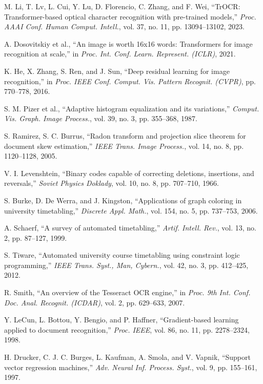 \documentclass[12pt,letterpaper]{report}
\begin{document}
\begin{enumerate}[label={[\arabic*]}, leftmargin=2.5em]
    \item M. Li, T. Lv, L. Cui, Y. Lu, D. Florencio, C. Zhang, and F. Wei, ``TrOCR: Transformer-based optical character recognition with pre-trained models,'' \textit{Proc. AAAI Conf. Human Comput. Intell.}, vol. 37, no. 11, pp. 13094--13102, 2023.
    \item A. Dosovitskiy et al., ``An image is worth 16x16 words: Transformers for image recognition at scale,'' in \textit{Proc. Int. Conf. Learn. Represent. (ICLR)}, 2021.
    \item K. He, X. Zhang, S. Ren, and J. Sun, ``Deep residual learning for image recognition,'' in \textit{Proc. IEEE Conf. Comput. Vis. Pattern Recognit. (CVPR)}, pp. 770--778, 2016.
    \item S. M. Pizer et al., ``Adaptive histogram equalization and its variations,'' \textit{Comput. Vis. Graph. Image Process.}, vol. 39, no. 3, pp. 355--368, 1987.
    \item S. Ramirez, S. C. Burrus, ``Radon transform and projection slice theorem for document skew estimation,'' \textit{IEEE Trans. Image Process.}, vol. 14, no. 8, pp. 1120--1128, 2005.
    \item V. I. Levenshtein, ``Binary codes capable of correcting deletions, insertions, and reversals,'' \textit{Soviet Physics Doklady}, vol. 10, no. 8, pp. 707--710, 1966.
    \item S. Burke, D. De Werra, and J. Kingston, ``Applications of graph coloring in university timetabling,'' \textit{Discrete Appl. Math.}, vol. 154, no. 5, pp. 737--753, 2006.
    \item A. Schaerf, ``A survey of automated timetabling,'' \textit{Artif. Intell. Rev.}, vol. 13, no. 2, pp. 87--127, 1999.
    \item S. Tiware, ``Automated university course timetabling using constraint logic programming,'' \textit{IEEE Trans. Syst., Man, Cybern.}, vol. 42, no. 3, pp. 412--425, 2012.
    \item R. Smith, ``An overview of the Tesseract OCR engine,'' in \textit{Proc. 9th Int. Conf. Doc. Anal. Recognit. (ICDAR)}, vol. 2, pp. 629--633, 2007.
    \item Y. LeCun, L. Bottou, Y. Bengio, and P. Haffner, ``Gradient-based learning applied to document recognition,'' \textit{Proc. IEEE}, vol. 86, no. 11, pp. 2278--2324, 1998.
    \item H. Drucker, C. J. C. Burges, L. Kaufman, A. Smola, and V. Vapnik, ``Support vector regression machines,'' \textit{Adv. Neural Inf. Process. Syst.}, vol. 9, pp. 155--161, 1997.

\end{enumerate}
\end{document}
